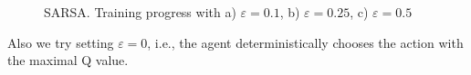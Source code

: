 \documentclass[a4paper, twoside, english]{article}
\begin{document}
\begin{figure}[h!]
	\centerline
	{
		\quad
		\quad
	}
	\caption[null]{SARSA. Training progress with a) $\varepsilon= 0.1$, b) $\varepsilon= 0.25$, c) $\varepsilon= 0.5$}
	\label{fig:SARSA1_eps}
\end{figure}

Also we try setting $\varepsilon=0$, i.e., the agent deterministically chooses the action with the maximal Q value. 
\end{document}
